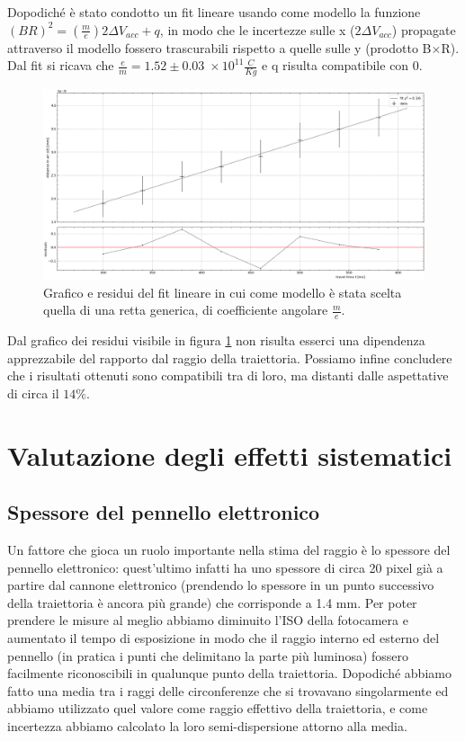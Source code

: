 \documentclass[10pt, a4paper, italian]{article}
\begin{document}
Dopodiché è stato condotto un fit lineare usando come modello la funzione $(BR)^2 = (\frac{m}{e})2\Delta V_{acc} +q$, in modo che le incertezze sulle x ($2\Delta V_{acc}$) propagate attraverso il modello fossero trascurabili rispetto a quelle sulle y (prodotto B$\times$R). Dal fit si ricava che $\frac{e}{m}=1.52 \pm 0.03 \; \times 10^{11} \frac{C}{Kg}$ e q risulta compatibile con 0.
\begin{figure}
\includegraphics[width=\textwidth]{linfit}
\caption{\label{fig:linfit}Grafico e residui del fit lineare in cui come modello è stata scelta quella di una retta generica, di coefficiente angolare $\frac{m}{e}$.}
\end{figure}
Dal grafico dei residui visibile in figura \ref{fig:linfit} non risulta esserci una dipendenza apprezzabile del rapporto dal raggio della traiettoria.
Possiamo infine concludere che i risultati ottenuti sono compatibili tra di loro, ma distanti dalle aspettative di circa il $14 \percent$.

\section{Valutazione degli effetti sistematici}

\subsection{Spessore del pennello elettronico}
Un fattore che gioca un ruolo importante nella stima del raggio è lo spessore del pennello elettronico: quest'ultimo infatti ha uno spessore di circa 20 pixel già a partire dal cannone elettronico (prendendo lo spessore in un punto successivo della traiettoria è ancora più grande) che corrisponde a 1.4 mm. Per poter prendere le misure al meglio abbiamo diminuito l'ISO della fotocamera e aumentato il tempo di esposizione in modo che il raggio interno ed esterno del pennello (in pratica i punti che delimitano la parte più luminosa) fossero facilmente riconoscibili in qualunque punto della traiettoria. Dopodiché abbiamo fatto una media tra i raggi delle circonferenze che si trovavano singolarmente ed abbiamo utilizzato quel valore come raggio effettivo della traiettoria, e come incertezza abbiamo calcolato la loro semi-dispersione attorno alla media.
\end{document}
